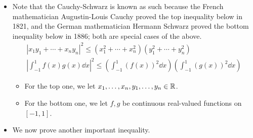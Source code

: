 \documentclass[../main.tex]{subfiles}
\begin{document}
\begin{itemize}
\begin{theorem}
\begin{proof}
            where $\inp{v}{w}=0$. It follows by the \hyperref[trm:pythagorean]{Pythagorean Theorem} that
            \begin{align*}
                \norm{u}^2 &= \norm{\frac{\inp{u}{v}}{\norm{v}^2}v}^2+\norm{w}^2\\
                &= \inp{\frac{\inp{u}{v}}{\norm{v}^2}v}{\frac{\inp{u}{v}}{\norm{v}^2}v}+\norm{w}^2\\
                &= \frac{\inp{u}{v}}{\norm{v}^2}\overline{\frac{\inp{u}{v}}{\norm{v}^2}}\inp{v}{v}+\norm{w}^2\\
                &= \frac{\inp{u}{v}\overline{\inp{u}{v}}}{\norm{v}^4}\norm{v}^2+\norm{w}^2\\
                &= \frac{|\inp{u}{v}|^2}{\norm{v}^2}+\norm{w}^2\\
                &\geq \frac{|\inp{u}{v}|^2}{\norm{v}^2}
            \end{align*}
            Multiplying both sides by $\norm{v}^2$ and taking square roots gives the desired inequality.\par
            Also note that the Cauchy-Schwarz inequality is an equality iff the last line is an equality, which happens iff $w=0$. But $w=0$ iff $u$ is a scalar multiple of $v$, as desired.
        \end{proof}
    \end{theorem}
    \item Note that the Cauchy-Schwarz is known as such because the French mathematician Augustin-Louis Cauchy proved the top inequality below in 1821, and the German mathematician Hermann Schwarz proved the bottom inequality below in 1886; both are special cases of the above.
    \begin{gather*}
        |x_1y_1+\cdots+x_ny_n|^2 \leq (x_1^2+\cdots+x_n^2)(y_1^2+\cdots+y_n^2)\\
        \left| \int_{-1}^1f(x)g(x)\dd{x} \right|^2 \leq \left( \int_{-1}^1(f(x))^2\dd{x} \right)\left( \int_{-1}^1(g(x))^2\dd{x} \right)
    \end{gather*}
    \begin{itemize}
        \item For the top one, we let $x_1,\dots,x_n,y_1,\dots,y_n\in\mathbb{R}$.
        \item For the bottom one, we let $f,g$ be continuous real-valued functions on $[-1,1]$.
    \end{itemize}
    \item We now prove another important inequality.
    \begin{theorem}

\end{theorem}
\end{itemize}
\end{document}
